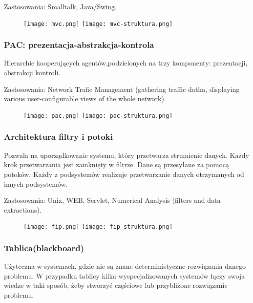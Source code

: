 \documentclass[a4paper]{article}
\begin{document}
    Zastosowania: Smalltalk, Java/Swing.

    \begin{figure}[H]
        \texttt{[image: mvc.png]}
        \texttt{[image: mvc-struktura.png]}
    \end{figure}



    \subsubsection{PAC: prezentacja-abstrakcja-kontrola}
    Hierarchie kooperujących agentów,podzielonych na trzy komponenty: prezentacji, abstrakcji kontroli.

    Zastosowania: Network Trafic Management (gathering traffic datha, displaying various user-configurable
    views of the whole network).

    \begin{figure}[h]
        \texttt{[image: pac.png]}
        \texttt{[image: pac-struktura.png]}
    \end{figure}



    \subsubsection{Architektura filtry i potoki}

    Pozwala na uporządkowanie systemu, który przetwarza strumienie danych. Każdy krok przetwarzania jest zamknięty w filtrze.
    Dane są przesyłane za pomocą potoków. Każdy z podsystemów realizuje przetwarzanie danych otrzymanych od innych podsystemów.

    Zastosowania: Unix, WEB, Servlet, Numerical Analysis (filters and data extractions).

    \begin{figure}[h]
        \texttt{[image: fip.png]}
        \texttt{[image: fip\_struktura.png]}
    \end{figure}




    \subsubsection{Tablica(blackboard)}
    Użyteczna w systemach, gdzie nie są znane deterministyczne rozwiązania danego problemu. W przypadku tablicy kilka wyspecjalizowanych
    systemów łączy swoja wiedze w taki sposób, żeby stworzyć częściowe lub przybliżone rozwiązanie problemu.
\end{document}
